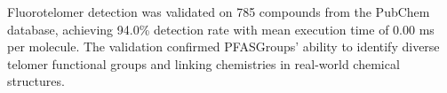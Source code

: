 
Fluorotelomer detection was validated on 785 compounds from the PubChem database, achieving 94.0\% detection rate with mean execution time of 0.00 ms per molecule. The validation confirmed PFASGroups' ability to identify diverse telomer functional groups and linking chemistries in real-world chemical structures.

